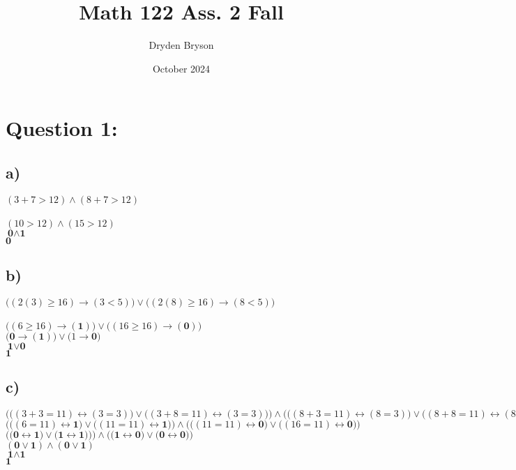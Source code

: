 \documentclass{article}
\title{Math 122 Ass. 2 Fall}
\author{Dryden Bryson}
\date{October 2024}
\begin{document}
\maketitle
\newpage
\section*{Question 1:}
\subsection*{a)}


\begin{center}
   $(3+7 > 12) \land (8+7 > 12)$\\ \\
    $(10 > 12) \land (15 > 12)$\\
    $\textbf{0} \land \textbf{1}$\\
    $\textbf{0}$
\end{center}

\subsection*{b)}

\begin{center}
    $\big((2(3) \geq 16)\rightarrow(3 < 5)\big)\lor\big((2(8) \geq 16)\rightarrow(8 < 5)\big)$\\ \\
    $\big((6 \geq 16)\rightarrow(\textbf{1})\big)\lor\big((16 \geq 16)\rightarrow(\textbf{0})\big)$\\
    $\big(\textbf{0}\rightarrow(\textbf{1})\big)\lor\big(1\rightarrow\textbf{0}\big)$\\
    $\textbf{1}\lor \textbf{0}$\\
    $\textbf{1}$
    
\end{center}


\subsection*{c)}

\begin{center}
    $\Big(\big((3+3=11) \leftrightarrow (3=3)\big)\lor
\big((3+8=11) \leftrightarrow (3=3)\big)\Big)\land
\Big(\big((8+3=11) \leftrightarrow (8=3)\big)\lor
\big((8+8=11) \leftrightarrow (8=3)\big)\Big)$\\

$\Big(\big((6=11) \leftrightarrow \textbf{1}\big)\lor
\big((11=11) \leftrightarrow \textbf{1}\big)\Big)\land
\Big(\big((11=11) \leftrightarrow \textbf{0}\big)\lor
\big((16=11) \leftrightarrow \textbf{0}\big)\Big)$\\

$\Big(\big(\textbf{0} \leftrightarrow \textbf{1}\big)\lor
\big(\textbf{1} \leftrightarrow \textbf{1})\big)\Big)\land
\Big(\big(\textbf{1} \leftrightarrow \textbf{0}\big)\lor
\big(\textbf{0} \leftrightarrow \textbf{0}\big)\Big)$\\
$(\textbf{0}\lor \textbf{1})\land (\textbf{0}\lor \textbf{1})$\\
$\textbf{1}\land\textbf{1}$\\
$\textbf{1}$
\end{center}
\end{document}
